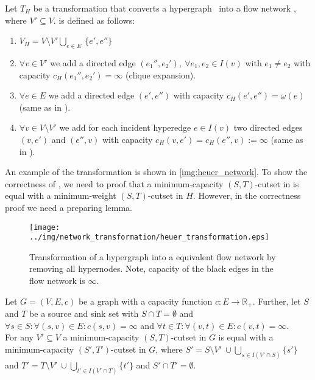 \begin{definition}
Let $T_H$ be a transformation that converts a hypergraph \HypergraphDef~into 
a flow network , where $V' \subseteq V$.  is defined as follows:
\begin{enumerate}
\item $V_H = V\setminus V' \bigcup\limits_{e \in E}\ \{e', e''\}$
\item $\forall v \in V'$ we add a directed edge $(e_1'', e_2'),\ \forall e_1, e_2 \in I(v)$ 
      with $e_1 \neq e_2$ with capacity $c_H(e_1'', e_2') = \infty$ (clique expansion).
\item $\forall e \in E$ we add a directed edge $(e',e'')$
      with capacity $c_H(e',e'') = \omega(e)$ (same as in ).
\item $\forall v \in V\setminus V'$ we add for each incident hyperedge $e \in I(v)$ two directed
      edges $(v,e')$ and $(e'',v)$ with capacity 
      $c_H(v,e') = c_H(e'',v) := \infty$ (same as in ).
\end{enumerate} 
\end{definition}

An example of the transformation is shown in \autoref{img:heuer_network}. To show
the correctness of , we need to proof that a minimum-capacity $(S,T)$-cutset
in  is equal with a minimum-weight $(S,T)$-cutset in $H$. However,
in the correctness proof we need a preparing lemma.

\begin{figure}
\centering
\texttt{[image: ../img/network\_transformation/heuer\_transformation.eps]}
\caption{Transformation of a hypergraph into a equivalent flow network by removing
         all hypernodes. Note, capacity of the black edges in the flow network is $\infty$.}
\label{img:heuer_network}
\end{figure}

\begin{lemma}
\label{lemma:lemma1}
Let $G = (V,E,c)$ be a graph with a capacity function $c: E \rightarrow \mathbb{R}_+$. Further, 
let $S$ and $T$ be a source and sink set with $S \cap T = \emptyset$ and
$\forall s \in S:\forall (s,v) \in E: c(s,v) = \infty$ and $\forall t 
\in T:\forall (v,t) \in E: c(v,t) = \infty$. \\
For any $V' \subseteq V$ a minimum-capacity $(S,T)$-cutset in $G$ is equal with a minimum-capacity
$(S',T')$-cutset in $G$, where $S' = S\setminus V'\ \cup \bigcup\limits_{s \in I(V' \cap S)} \{s'\}$ and 
$T' = T\setminus V'\ \cup \bigcup\limits_{t' \in I(V' \cap T)} \{t'\}$ and $S' \cap T' = \emptyset$.
\end{lemma}

